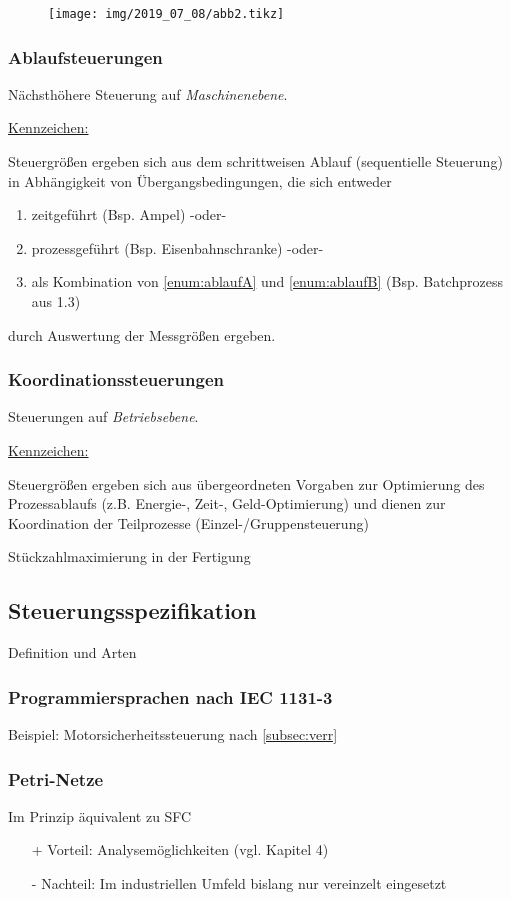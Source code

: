 \begin{figure}[H]
	\centering
	\texttt{[image: img/2019\_07\_08/abb2.tikz]}
\end{figure}

\subsubsection{Ablaufsteuerungen}
Nächsthöhere Steuerung auf \textit{Maschinenebene}.

\underline{Kennzeichen:}

Steuergrößen ergeben sich aus dem schrittweisen Ablauf (sequentielle Steuerung) in Abhängigkeit von Übergangsbedingungen, die sich entweder
\begin{enumerate}[label=(\alph*)]
	\item zeitgeführt (Bsp. Ampel) -oder- \label{enum:ablaufA}
	\item prozessgeführt (Bsp. Eisenbahnschranke) -oder- \label{enum:ablaufB}
	\item als Kombination von \ref{enum:ablaufA} und \ref{enum:ablaufB} (Bsp. Batchprozess aus 1.3)
\end{enumerate}
durch Auswertung der Messgrößen ergeben.

\subsubsection{Koordinationssteuerungen}
Steuerungen auf \textit{Betriebsebene}.

\underline{Kennzeichen:}

Steuergrößen ergeben sich aus übergeordneten Vorgaben zur Optimierung des Prozessablaufs (z.B. Energie-, Zeit-, Geld-Optimierung) und dienen zur Koordination der Teilprozesse (Einzel-/Gruppensteuerung)

Stückzahlmaximierung in der Fertigung

\subsection{Steuerungsspezifikation}
Definition und Arten 

\subsubsection{Programmiersprachen nach IEC 1131-3}
Beispiel: Motorsicherheitssteuerung nach \ref{subsec:verr} 

\subsubsection{Petri-Netze}
Im Prinzip äquivalent zu SFC
\begin{itemize}
	\item[+] Vorteil: Analysemöglichkeiten (vgl. Kapitel 4)
	\item[-] Nachteil: Im industriellen Umfeld bislang nur vereinzelt eingesetzt 
\end{itemize} 

